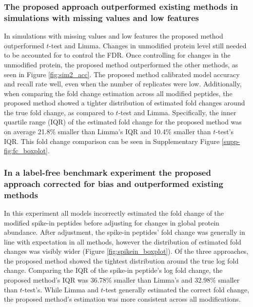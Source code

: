 \documentclass[mcp]{article}
\numberwithin{table}{section}
\begin{document}
\subsubsection*{The proposed approach outperformed existing methods in simulations with missing values and low features}

In simulations with missing values and low features the proposed method outperformed $t$-test and Limma. Changes in unmodified protein level still needed to be accounted for to control the FDR. Once controlling for changes in the unmodified protein, the proposed method outperformed the other methods, as seen in Figure \ref{fig:sim2_acc}. The proposed method calibrated model accuracy and recall rate well, even when the number of replicates were low. Additionally, when comparing the fold change estimation across all modified peptides, the proposed method showed a tighter distribution of estimated fold changes around the true fold change, as compared to $t$-test and Limma. Specifically, the inner quartile range (IQR) of the estimated fold change for the proposed method was on average 21.8\% smaller than Limma's IQR and 10.4\% smaller than $t$-test's IQR. This fold change comparison can be seen in Supplementary Figure \ref{supp-fig:fc_boxplot}.

\subsubsection*{In a label-free benchmark experiment the proposed approach corrected for bias and outperformed existing methods}

In this experiment all models incorrectly estimated the fold change of the modified spike-in peptides before adjusting for changes in global protein abundance. After adjustment, the spike-in peptides' fold change was generally in line with expectation in all methods, however the distribution of estimated fold changes was visibly wider (Figure \ref{fig:spikein_boxplot}). Of the three approaches, the proposed method showed the tightest distribution around the true log fold change. Comparing the IQR of the spike-in peptide's log fold change, the proposed method's IQR was 36.78\% smaller than Limma's and 32.98\% smaller than $t$-test's. While Limma and $t$-test generally estimated the correct fold change, the proposed method's estimation was more consistent across all modifications.
\end{document}
